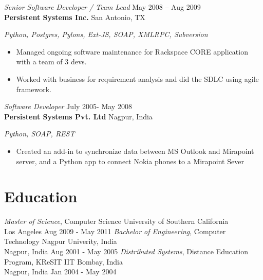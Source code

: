 \documentclass[margin,line]{resume}
\begin{document}
\begin{resume}
{\sl Senior Software Developer / Team Lead } \hfill
     May 2008 – Aug 2009\\
     \textbf{Persistent Systems Inc.} \hfill
     San Antonio, TX\\[4pt]
{\small\centering\textit{Python, Postgres, Pylons, Ext-JS, SOAP, XMLRPC, Subversion }\par}\vspace*{-\baselineskip}
\vspace{4pt}
\begin{itemize} \itemsep -2pt %
\small\item Managed ongoing software maintenance for Rackspace CORE application with a team of 3 devs.
\small\item Worked with business for requirement analysis and did the SDLC using agile framework.
\end{itemize}
\vspace{-\baselineskip} %
\vspace{4pt}
{\sl Software Developer } \hfill
     July 2005- May 2008\\
     \textbf{Persistent Systems Pvt. Ltd } \hfill
     Nagpur, India\\[4pt]
{\small\centering\textit{Python, SOAP, REST }\par}\vspace*{-\baselineskip}
\vspace{4pt}
\begin{itemize} \itemsep -2pt %
\small\item Created an add-in to synchronize data between MS Outlook and Mirapoint server, and a Python app to connect Nokia phones to a Mirapoint Sever
\end{itemize}
\vspace{4pt}
\section{Education}
{\small
  {\sl Master of Science}, Computer Science \hfill
  University of Southern California\\
  Los Angeles \hfill
  Aug 2009 - May 2011
}
\linebreak
{\small
  {\sl Bachelor of Engineering}, Computer Technology \hfill
  Nagpur Univerity, India\\
  Nagpur, India \hfill
  Aug 2001 - May 2005  
}
\linebreak
{\small
  {\sl Distributed Systems}, Distance Education Program, KReSIT  \hfill
  IIT Bombay, India \\
  Nagpur, India \hfill
  Jan 2004 - May 2004
}

\end{resume}
\end{document}
